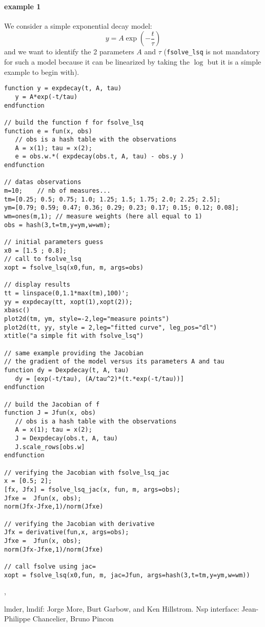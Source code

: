 \begin{examples}
\paragraph{example 1} 
We consider a simple exponential decay model:
$$
 y = A \exp(-\frac{t}{\tau})
$$
and we want to identify the 2 parameters $A$ and $\tau$ (\verb+fsolve_lsq+ is not
mandatory for such a model because it can be linearized by taking the $\log$ but
it is a simple example to begin with). 

\begin{Verbatim}
function y = expdecay(t, A, tau)
   y = A*exp(-t/tau) 
endfunction

// build the function f for fsolve_lsq
function e = fun(x, obs)
   // obs is a hash table with the observations
   A = x(1); tau = x(2);
   e = obs.w.*( expdecay(obs.t, A, tau) - obs.y )
endfunction

// datas observations
m=10;    // nb of measures...
tm=[0.25; 0.5; 0.75; 1.0; 1.25; 1.5; 1.75; 2.0; 2.25; 2.5];
ym=[0.79; 0.59; 0.47; 0.36; 0.29; 0.23; 0.17; 0.15; 0.12; 0.08];
wm=ones(m,1); // measure weights (here all equal to 1)
obs = hash(3,t=tm,y=ym,w=wm);

// initial parameters guess
x0 = [1.5 ; 0.8];
// call to fsolve_lsq
xopt = fsolve_lsq(x0,fun, m, args=obs)

// display results
tt = linspace(0,1.1*max(tm),100)';
yy = expdecay(tt, xopt(1),xopt(2));
xbasc()
plot2d(tm, ym, style=-2,leg="measure points")
plot2d(tt, yy, style = 2,leg="fitted curve", leg_pos="dl")
xtitle("a simple fit with fsolve_lsq")

// same example providing the Jacobian
// the gradient of the model versus its parameters A and tau
function dy = Dexpdecay(t, A, tau)
   dy = [exp(-t/tau), (A/tau^2)*(t.*exp(-t/tau))]
endfunction

// build the Jacobian of f
function J = Jfun(x, obs)
   // obs is a hash table with the observations
   A = x(1); tau = x(2);
   J = Dexpdecay(obs.t, A, tau)
   J.scale_rows[obs.w]
endfunction

// verifying the Jacobian with fsolve_lsq_jac
x = [0.5; 2]; 
[fx, Jfx] = fsolve_lsq_jac(x, fun, m, args=obs);
Jfxe =  Jfun(x, obs);
norm(Jfx-Jfxe,1)/norm(Jfxe)

// verifying the Jacobian with derivative
Jfx = derivative(fun,x, args=obs);
Jfxe =  Jfun(x, obs);
norm(Jfx-Jfxe,1)/norm(Jfxe)

// call fsolve using jac=
xopt = fsolve_lsq(x0,fun, m, jac=Jfun, args=hash(3,t=tm,y=ym,w=wm))
\end{Verbatim}

\end{examples}

\begin{manseealso}
  , 
\end{manseealso}

\begin{authors}
 lmder, lmdif: Jorge More, Burt Garbow, and Ken Hillstrom. Nsp interface: Jean-Philippe Chancelier, Bruno Pincon
\end{authors}

